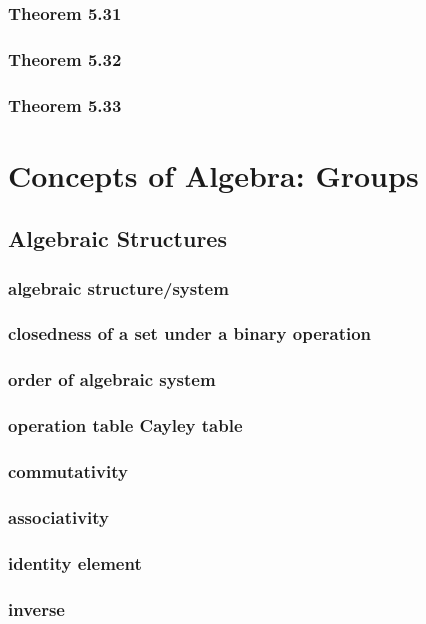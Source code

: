 \documentclass[a4paper]{article}
\begin{document}
\subsubsection*{Theorem 5.31}
\subsubsection*{Theorem 5.32}
\subsubsection*{Theorem 5.33}
\newpage
\section{Concepts of Algebra: Groups}   %
\subsection{Algebraic Structures}   %
\subsubsection*{algebraic structure/system}
\subsubsection*{closedness of a set under a binary operation}
\subsubsection*{order of algebraic system}
\subsubsection*{operation table Cayley table}
\subsubsection*{commutativity}
\subsubsection*{associativity}
\subsubsection*{identity element}
\subsubsection*{inverse}
\end{document}
